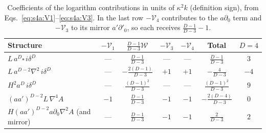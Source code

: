 \documentclass[aps,prd,onecolumn,10pt,nofootinbib,floatfix]{revtex4-2}
\begin{document}
\begin{table}[htbp]
\caption{Coefficients of the logarithm contributions in units of $\kappa^2k$ (definition sign), from
Eqs.~\eqref{eq:s4a:V1}--\eqref{eq:s4a:V3}. In the last row $-\mathcal V_4$ contributes to the $a\partial_0$
term and $-\mathcal V_3$ to its mirror $a'\partial'_0$, so each receives $\frac{D-1}{D-3}-1$.}
\label{tab:s4a:logsum}
\renewcommand{\arraystretch}{1.4}
\begin{ruledtabular}
\begin{tabular}{lcccccc}
Structure & $-\mathcal V_1$ & $\frac{D-1}{D-3}\mathcal W$ & $-\mathcal V_3$ & $-\mathcal V_4$ & Total & $D=4$\\
\hline
$L\,a^D\square\,i\delta^D$ & --- & $\frac{D-1}{D-3}$ & --- & --- & $\frac{D-1}{D-3}$ & $3$\\
$L\,a^{D-2}\nabla^2\,i\delta^D$ & --- & $-\frac{2(D-1)}{D-3}$ & $+1$ & $+1$ & $-\frac{4}{D-3}$ & $-4$\\
$H^2a^D\,i\delta^D$ & --- & $\frac{(D-1)^2}{D-3}$ & --- & --- & $\frac{(D-1)^2}{D-3}$ & $9$\\
$(aa')^{D-2}L\,\nabla^4A$ & $-1$ & $\frac{D-1}{D-3}$ & $-1$ & $-1$ & $-\frac{2(D-4)}{D-3}$ & $0$\\
$H(aa')^{D-2}a\partial_0\nabla^2A$ (and mirror) & --- & $\frac{D-1}{D-3}$ & $-1$ & $-1$ & $\frac{2}{D-3}$ & $2$\\
\end{tabular}
\end{ruledtabular}
\end{table}
\end{document}
